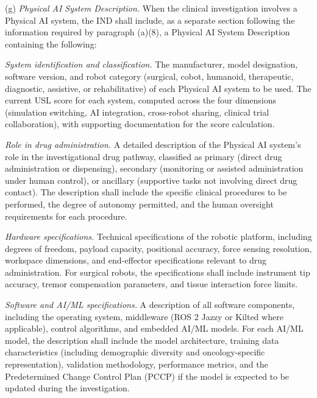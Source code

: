(g) \textit{Physical AI System Description.} When the clinical investigation involves a Physical AI system, the IND shall include, as a separate section following the information required by paragraph (a)(8), a Physical AI System Description containing the following:

\begin{description}[leftmargin=0.8cm,style=sameline]
\item[(i)] \textit{System identification and classification.} The manufacturer, model designation, software version, and robot category (surgical, cobot, humanoid, therapeutic, diagnostic, assistive, or rehabilitative) of each Physical AI system to be used. The current USL score for each system, computed across the four dimensions (simulation switching, AI integration, cross-robot sharing, clinical trial collaboration), with supporting documentation for the score calculation.

\item[(ii)] \textit{Role in drug administration.} A detailed description of the Physical AI system's role in the investigational drug pathway, classified as primary (direct drug administration or dispensing), secondary (monitoring or assisted administration under human control), or ancillary (supportive tasks not involving direct drug contact). The description shall include the specific clinical procedures to be performed, the degree of autonomy permitted, and the human oversight requirements for each procedure.

\item[(iii)] \textit{Hardware specifications.} Technical specifications of the robotic platform, including degrees of freedom, payload capacity, positional accuracy, force sensing resolution, workspace dimensions, and end-effector specifications relevant to drug administration. For surgical robots, the specifications shall include instrument tip accuracy, tremor compensation parameters, and tissue interaction force limits.

\item[(iv)] \textit{Software and AI/ML specifications.} A description of all software components, including the operating system, middleware (ROS 2 Jazzy or Kilted where applicable), control algorithms, and embedded AI/ML models. For each AI/ML model, the description shall include the model architecture, training data characteristics (including demographic diversity and oncology-specific representation), validation methodology, performance metrics, and the Predetermined Change Control Plan (PCCP) if the model is expected to be updated during the investigation.


\end{description}
